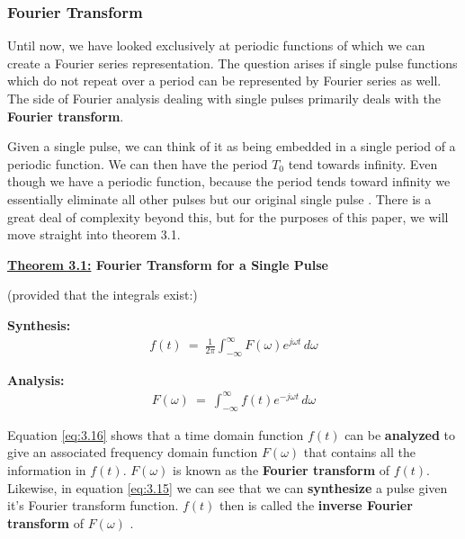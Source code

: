 \documentclass[10pt]{article}
\begin{document}
\subsubsection{Fourier Transform}

\hspace{\parindent} Until now, we have looked exclusively at periodic functions of which we can create a Fourier series representation. The question arises if single pulse functions which do not repeat over a period can be represented by Fourier series as well. The side of Fourier analysis dealing with single pulses primarily deals with the \textbf{Fourier transform}.

Given a single pulse, we can think of it as being embedded in a single period of a periodic function. We can then have the period $T_0$ tend towards infinity. Even though we have a periodic function, because the period tends toward infinity we essentially eliminate all other pulses but our original single pulse \cite{morrison1994fourier}. There is a great deal of complexity beyond this, but for the purposes of this paper, we will move straight into theorem 3.1.

\vspace{3mm}
\noindent
\textbf{\underline{Theorem 3.1:} Fourier Transform for a Single Pulse}

\vspace{1mm}
\noindent
\hspace{2mm}(provided that the integrals exist:)

\textbf{Synthesis:}
\begin{equation} \label{eq:3.15}
\begin{aligned}
    f(t) \: = \: \frac{1}{2\pi}\int_{-\infty}^{\infty} F(\omega) e^{j\omega t} \,d\omega
\end{aligned}
\end{equation}

\textbf{Analysis:}
\begin{equation} \label{eq:3.16}
\begin{aligned}
    F(\omega) \: = \: \int_{-\infty}^{\infty} f(t) e^{-j\omega t} \,d\omega
\end{aligned}
\end{equation}

\vspace{2mm}
Equation \eqref{eq:3.16} shows that a time domain function $f(t)$ can be \textbf{analyzed} to give an associated frequency domain function $F(\omega)$ that contains all the information in $f(t)$. $F(\omega)$ is known as the \textbf{Fourier transform} of $f(t)$. Likewise, in equation \eqref{eq:3.15} we can see that we can \textbf{synthesize} a pulse given it's Fourier transform function. $f(t)$ then is called the \textbf{inverse Fourier transform} of $F(\omega)$ \cite{morrison1994fourier}.
\end{document}

